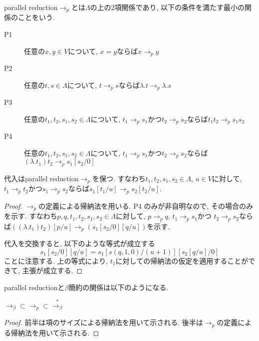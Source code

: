 \documentclass[12pt, titlepage]{ltjsarticle}
\begin{document}
\begin{defn}
 parallel reduction$\rightarrow_{p}$とは$\Lambda$の上の$2$項関係であり, 以下の条件を満たす最小の関係のことをいう.
 \begin{description}
  \item[P1] 任意の$x, y \in V$について, $x = y$ならば$x \rightarrow_{p} y$
  \item[P2] 任意の$t, s \in \Lambda$について, $t \rightarrow_{p} s$ならば$\lambda. t \rightarrow_{p} \lambda. s$
  \item[P3] 任意の$t_1, t_2, s_1, s_2 \in \Lambda$について,
        $t_1 \rightarrow_{p} s_1$かつ$t_2 \rightarrow_{p} s_2$ならば$t_1 t_2 \rightarrow_{p} s_1 s_2$
  \item[P4] 任意の$t_1, t_2, s_1, s_2 \in \Lambda$について,
        $t_1 \rightarrow_{p} s_1$かつ$t_2 \rightarrow_{p} s_2$ならば$(\lambda. t_1) t_2 \rightarrow_{p} s_1[s_2/0]$
 \end{description}
\end{defn}

\begin{lem}\label{spp}
 代入はparallel reduction$\rightarrow_{p}$を保つ. すなわち$t_1, t_2, s_1, s_2 \in \Lambda$, $u \in V$に対して, $t_1 \rightarrow_{p} t_2$かつ$s_1 \rightarrow_{p} s_2$ならば$s_1[t_1/u] \rightarrow_{p} s_2[t_2/u]$.
\end{lem}

\begin{proof}
 $\rightarrow_{p}$の定義による帰納法を用いる. P4%
のみが非自明なので, その場合のみを示す.
 すなわち$p, q, t_1, t_2, s_1, s_2 \in \Lambda$に対して,
$p \rightarrow_{p} q$, $t_1 \rightarrow_{p} s_1$かつ $t_2 \rightarrow_{p} s_2$ならば$((\lambda. t_1) t_2) [p / u] \rightarrow_{p} (s_1 [s_2 / 0] [q / u])$を示す.

 代入を交換すると, 以下のような等式が成立する
 \[
 s_1 [s_2 / 0][q / u] = s_1 [s(q, 1, 0) / (u + 1)][s_2 [q / u] / 0]
 \]
 ことに注意する. 上の等式により, $t_1$に対しての帰納法の仮定を適用することができて, 主張が成立する.
\end{proof}

parallel reductionと$\beta$簡約の関係は以下のようになる.

\begin{lem}
 $\rightarrow_{\beta} \subset \rightarrow_{p} \subset \overset{*}{\rightarrow_{\beta}}$
\end{lem}

\begin{proof}
 前半は項のサイズによる帰納法を用いて示される. 後半は$\rightarrow_{p}$の定義による帰納法を用いて示される.
\end{proof}
\end{document}
